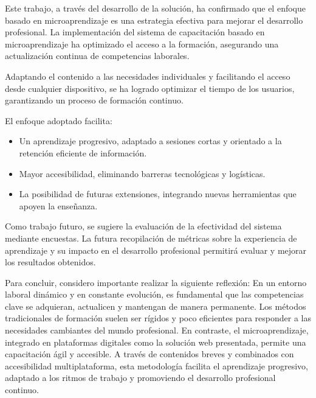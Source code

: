 

Este trabajo, a través del desarrollo de la solución, ha confirmado que el
enfoque basado en microaprendizaje es una estrategia efectiva para mejorar el
desarrollo profesional. La implementación del sistema de capacitación basado en
microaprendizaje ha optimizado el acceso a la formación, asegurando una
actualización continua de competencias laborales.

Adaptando el contenido a las necesidades individuales y facilitando el acceso
desde cualquier dispositivo, se ha logrado optimizar el tiempo de los usuarios,
garantizando un proceso de formación continuo.

El enfoque adoptado facilita:
\begin{itemize}
    \item Un aprendizaje progresivo, adaptado a sesiones cortas y orientado a la
    retención eficiente de información.
    \item Mayor accesibilidad, eliminando barreras tecnológicas y logísticas.
    \item La posibilidad de futuras extensiones, integrando nuevas herramientas
    que apoyen la enseñanza.
\end{itemize}

Como trabajo futuro, se sugiere la evaluación de la efectividad del sistema
mediante encuestas. La futura recopilación de métricas sobre la experiencia de
aprendizaje y su impacto en el desarrollo profesional permitirá evaluar y
mejorar los resultados obtenidos.

Para concluir, considero importante realizar la siguiente reflexión: En un
entorno laboral dinámico y en constante evolución, es fundamental que las
competencias clave se adquieran, actualicen y mantengan de manera permanente.
Los métodos tradicionales de formación suelen ser rígidos y poco eficientes para
responder a las necesidades cambiantes del mundo profesional. En contraste, el
microaprendizaje, integrado en plataformas digitales como la solución web
presentada, permite una capacitación ágil y accesible. A través de contenidos
breves y combinados con accesibilidad multiplataforma, esta metodología facilita
el aprendizaje progresivo, adaptado a los ritmos de trabajo y promoviendo el
desarrollo profesional continuo.




